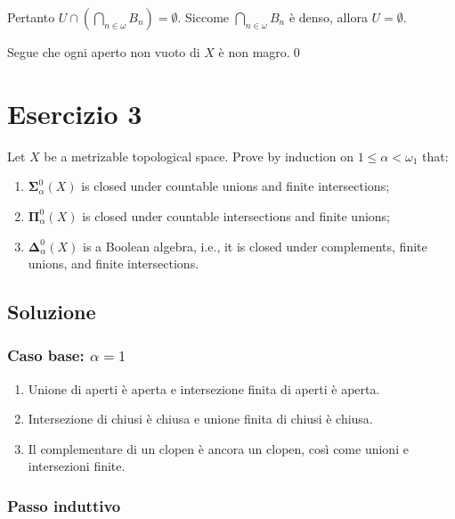 \documentclass{article}
\newcommand{\1}{\mathds{1}}
\begin{document}
Pertanto \(U\cap \left(\bigcap_{n \in \omega} B_{n}\right) = \emptyset\). Siccome \(\bigcap_{n \in\omega} B_{n}\) è denso, allora \(U=\emptyset\).

Segue che ogni aperto non vuoto di \(X\) è non magro.\qed
\section{Esercizio 3}
\label{sec:org624d793}

Let \(X\) be a metrizable topological space. Prove by induction on \(1 \leq \alpha < \omega_1\) that:
\begin{enumerate}
\item \(\bm{\Sigma}^0_\alpha(X)\) is closed under countable unions and finite intersections;
\item \(\bm{\Pi}^0_\alpha(X)\) is closed under countable intersections and finite unions;
\item \(\bm{\Delta}^0_\alpha(X)\) is a Boolean algebra, i.e., it is closed under complements, finite unions, and finite intersections.
\end{enumerate}
\subsection{Soluzione}
\label{sec:orgc24262c}

\subsubsection{Caso base: \(\alpha=1\)}
\label{sec:org65744de}

\begin{enumerate}
\item Unione di aperti è aperta e intersezione finita di aperti è aperta.
\item Intersezione di chiusi è chiusa e unione finita di chiusi è chiusa.
\item Il complementare di un clopen è ancora un clopen, così come unioni e intersezioni finite.
\end{enumerate}
\subsubsection{Passo induttivo}
\label{sec:orgc6b42db}
\end{document}
